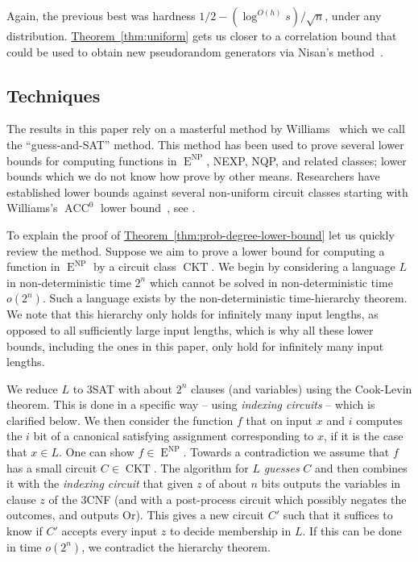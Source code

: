 \documentclass[11pt]{article}
\newcommand{\expref}[2]{\texorpdfstring{\hyperref[#2]{#1~\ref{#2}}}{#1~\ref{#2}}}
\DeclareMathOperator{\ACC}{\mathrm{ACC}}  %
\DeclareMathOperator{\NP}{\mathrm{NP}}  %
\DeclareMathOperator{\EEE}{\mathrm{E}}  %
\DeclareMathOperator{\CKT}{\mathrm{CKT}}  %
\begin{document}
Again, the previous best was hardness $1/2-(\log^{O(h)}s)/\sqrt{n}$,
under any distribution. \expref{Theorem}{thm:uniform} gets us closer
to a correlation bound that could be used to obtain new pseudorandom
generators via Nisan's method~\cite{Nis91}.

\subsection{Techniques \label{subsec:Techniques}}

The results in this paper rely on a masterful method by Williams~\cite{Williams13-Improving}
which we call the ``guess-and-SAT'' method. This method has been
used to prove several lower bounds for computing functions in $\EEE^{\NP}$, NEXP, NQP,
and related classes; lower bounds which we do not know how prove by
other means. Researchers have established lower bounds against several
non-uniform circuit classes starting with
%
Williams's  %
$\ACC^{0}$ lower
bound~\cite{Williams14-acc-jacm}, see \cite{Williams11,Williams13,Williams14,AlmanCW16,Tamaki16,DBLP:journals/eccc/Chen19,DBLP:conf/latin/ChenOS18,DBLP:conf/stoc/MurrayW18,DBLP:conf/mfcs/RajgopalS018,AlmanC19,VyasWilliams20,ChenRen20}.

To explain the proof of \expref{Theorem}{thm:prob-degree-lower-bound}
let us quickly review the method. Suppose we aim to prove a lower
bound for computing a function in $\EEE^{\NP}$ by a circuit class $\CKT$.
We begin by considering a language $L$ in non-deterministic time
$2^{n}$ which cannot be solved in non-deterministic time $o(2^{n})$.
Such a language exists by the non-deterministic time-hierarchy theorem.
We note that this hierarchy only holds for infinitely many input lengths,
as opposed to all sufficiently large input lengths, which is why all
these lower bounds, including the ones in this paper, only hold for
infinitely many input lengths.

We reduce $L$ to 3SAT with about $2^{n}$ clauses (and variables)
using the Cook-Levin theorem. This is done in a specific way -- using
\emph{indexing circuits} -- which is clarified below. We then consider
the function $f$ that on input $x$ and $i$ computes the $i$ bit
of a canonical satisfying assignment corresponding to $x$, if it
is the case that $x\in L$. One can show $f\in \EEE^{\NP}$. Towards a
contradiction we assume that $f$ has a small circuit $C\in \CKT$.
The algorithm for $L$ \emph{guesses }$C$ and then combines it with
the \emph{indexing circuit} that given $z$ of about $n$ bits outputs
the variables in clause $z$ of the 3CNF (and with a post-process
circuit which possibly negates the outcomes, and outputs Or). This
gives a new circuit $C'$ such that it suffices to know if $C'$ accepts
every input $z$ to decide membership in $L$. If this can be done
in time $o(2^{n})$, we contradict the hierarchy theorem.
\end{document}
